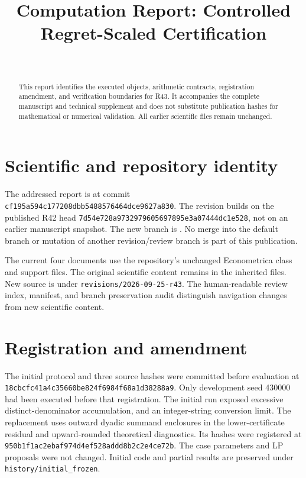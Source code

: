 


\begin{frontmatter}
\title{Computation Report: Controlled Regret-Scaled Certification}
\begin{aug}\author[id=au1,addressref={add1}]{~}\address[id=add1]{}\end{aug}
\begin{abstract}This report identifies the executed objects, arithmetic contracts, registration amendment, and verification boundaries for R43. It accompanies the complete manuscript and technical supplement and does not substitute publication hashes for mathematical or numerical validation. All earlier scientific files remain unchanged.
\end{abstract}
\end{frontmatter}

\section{Scientific and repository identity}
The addressed report is  at commit \nolinkurl{cf195a594c177208dbb5488576464dce9627a830}. The revision builds on the published R42 head \nolinkurl{7d54e728a9732979605697895e3a07444dc1e528}, not on an earlier manuscript snapshot. The new branch is . No merge into the default branch or mutation of another revision/review branch is part of this publication.

The current four documents use the repository's unchanged Econometrica class and support files. The original scientific content remains in the inherited files. New source is under \texttt{revisions/2026-09-25-r43}. The human-readable review index, manifest, and branch preservation audit distinguish navigation changes from new scientific content.

\section{Registration and amendment}
The initial protocol and three source hashes were committed before evaluation at \nolinkurl{18cbcfc41a4c35660be824f6984f68a1d38288a9}. Only development seed 430000 had been executed before that registration. The initial run exposed excessive distinct-denominator accumulation, and an integer-string conversion limit. The replacement uses outward dyadic summand enclosures in the lower-certificate residual and upward-rounded theoretical diagnostics. Its hashes were registered at \nolinkurl{950b1f1ac2ebaf974d4ef528addd8b2c2e4ce72b}. The case parameters and LP proposals were not changed. Initial code and partial results are preserved under \texttt{history/initial\_frozen}.

